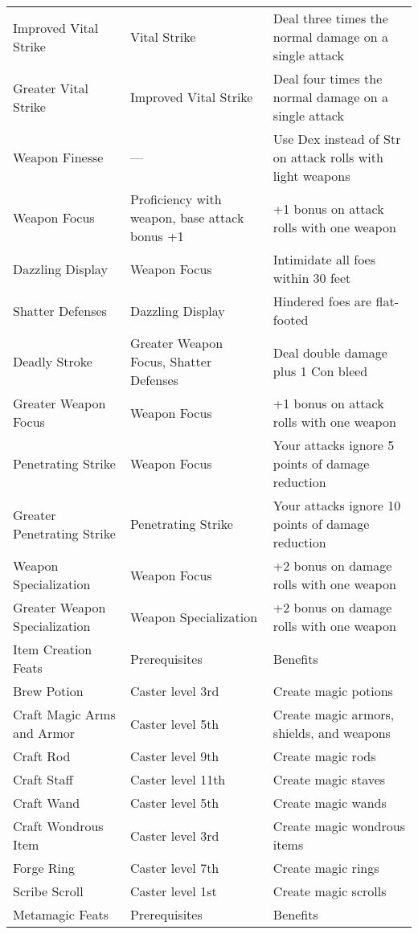 \begin{table}[]
\begin{tabular}{lll}
\quad Improved Vital Strike & Vital Strike & Deal three times the normal damage on a single attack\\
\quad \quad Greater Vital Strike & Improved Vital Strike & Deal four times the normal damage on a single attack\\
Weapon Finesse & — & Use Dex instead of Str on attack rolls with light weapons\\
Weapon Focus & Proficiency with weapon, base attack bonus +1 & +1 bonus on attack rolls with one weapon\\
\quad Dazzling Display & Weapon Focus & Intimidate all foes within 30 feet\\
\quad \quad Shatter Defenses & Dazzling Display & Hindered foes are flat-footed \\
\quad \quad \quad Deadly Stroke & Greater Weapon Focus, Shatter Defenses & Deal double damage plus 1 Con bleed \\
\quad Greater Weapon Focus & Weapon Focus & +1 bonus on attack rolls with one weapon\\
\quad Penetrating Strike & Weapon Focus & Your attacks ignore 5 points of damage reduction\\
\quad \quad Greater Penetrating Strike & Penetrating Strike & Your attacks ignore 10 points of damage reduction\\
\quad Weapon Specialization & Weapon Focus & +2 bonus on damage rolls with one weapon\\
\quad \quad Greater Weapon Specialization & Weapon Specialization & +2 bonus on damage rolls with one weapon\\
Item Creation Feats & Prerequisites & Benefits\\
Brew Potion & Caster level 3rd & Create magic potions\\
Craft Magic Arms and Armor & Caster level 5th & Create magic armors, shields, and weapons\\
Craft Rod & Caster level 9th & Create magic rods\\
Craft Staff & Caster level 11th & Create magic staves\\
Craft Wand & Caster level 5th & Create magic wands\\
Craft Wondrous Item & Caster level 3rd & Create magic wondrous items\\
Forge Ring & Caster level 7th & Create magic rings\\
Scribe Scroll & Caster level 1st & Create magic scrolls\\
Metamagic Feats & Prerequisites & Benefits\\

\end{tabular}
\end{table}
